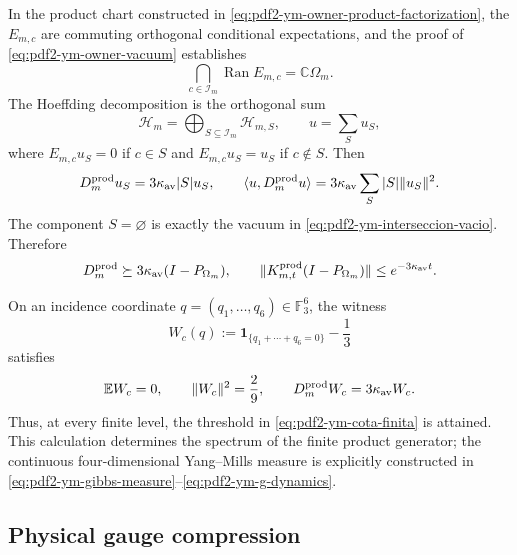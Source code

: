 In the product chart constructed in
\eqref{eq:pdf2-ym-owner-product-factorization}, the $E_{m,c}$ are commuting
orthogonal conditional expectations, and the proof of
\eqref{eq:pdf2-ym-owner-vacuum} establishes
\begin{equation}\label{eq:pdf2-ym-interseccion-vacio}
 \bigcap_{c\in\mathcal I_m}\operatorname{Ran}E_{m,c}
 =\mathbb C\Omega_m.
\end{equation}
The Hoeffding decomposition is the orthogonal sum
\[
 \mathcal H_m=\bigoplus_{S\subseteq\mathcal I_m}\mathcal H_{m,S},
 \qquad u=\sum_Su_S,
\]
where $E_{m,c}u_S=0$ if $c\in S$ and $E_{m,c}u_S=u_S$ if $c\notin S$.
Then
\begin{equation}\label{eq:pdf2-ym-hoeffding}
 D_m^{\rm prod}u_S=3\kappa_{\rm av}|S|u_S,
 \qquad
 \langle u,D_m^{\rm prod}u\rangle
 =3\kappa_{\rm av}\sum_S|S|\|u_S\|^2.
\end{equation}
The component $S=\varnothing$ is exactly the vacuum in
\eqref{eq:pdf2-ym-interseccion-vacio}. Therefore
\begin{equation}\label{eq:pdf2-ym-cota-finita}
 D_m^{\rm prod}\succeq
 3\kappa_{\rm av}(I-P_{\Omega_m}),
 \qquad
 \|K^{\rm prod}_{m,t}(I-P_{\Omega_m})\|
 \le e^{-3\kappa_{\rm av}t}.
\end{equation}

On an incidence coordinate
$q=(q_1,\ldots,q_6)\in\mathbb F_3^6$, the witness
\begin{equation}\label{eq:pdf2-ym-wc}
 W_c(q):=\mathbf1_{\{q_1+\cdots+q_6=0\}}-\frac13
\end{equation}
satisfies
\begin{equation}\label{eq:pdf2-ym-wc-momentos}
 \mathbb EW_c=0,\qquad \|W_c\|^2=\frac29,\qquad
 D_m^{\rm prod}W_c=3\kappa_{\rm av}W_c.
\end{equation}
Thus, at every finite level, the threshold in
\eqref{eq:pdf2-ym-cota-finita} is attained. This calculation determines the spectrum of the
finite product generator; the continuous four-dimensional Yang--Mills measure is
explicitly constructed in
\eqref{eq:pdf2-ym-gibbs-measure}--\eqref{eq:pdf2-ym-g-dynamics}.

\subsection{Physical gauge compression}

